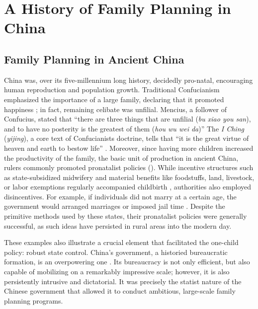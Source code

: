 \documentclass[12pt, a4paper, twoside]{article}
\begin{document}
\section{A History of Family Planning in China}
\subsection{Family Planning in Ancient China}

China was, over its five-millennium long history, decidedly pro-natal, encouraging human reproduction and population growth. Traditional Confucianism emphasized the importance of a large family, declaring that it promoted happiness \autocite[p. 935]{WangEtAl2016AJS}; in fact, remaining celibate was unfilial. Mencius, a follower of Confucius, stated that “there are three things that are unfilial (\emph{bu xiao you san}), and to have no posterity is the greatest of them (\emph{hou wu wei da})” \autocite{MenciusLeggeWikisource} The \emph{I Ching} (\emph{yijing}), a core text of Confucianists doctrine, tells that “it is the great virtue of heaven and earth to bestow life” \autocite{LiShuhua2012IChing}. Moreover, since having more children increased the productivity of the family, the basic unit of production in ancient China, rulers commonly promoted pronatalist policies (\cites[p.\ 15]{EntwisleHenderson2000}[p.\ 933]{WangEtAl2016AJS}{SJSUWatkinsCulturalRevolutionSite}). While incentive structures such as state-subsidized midwifery and material benefits like foodstuffs, land, livestock, or labor exemptions regularly accompanied childbirth \autocite[pp.\ 931--934]{WangEtAl2016AJS}, authorities also employed disincentives. For example, if individuals did not marry at a certain age, the government would arranged marriages or imposed jail time \autocite[p.\ 933]{WangEtAl2016AJS}. Despite the primitive methods used by these states, their pronatalist policies were generally successful, as such ideas have persisted in rural areas into the modern day.

These examples also illustrate a crucial element that facilitated the one-child policy: robust state control. China’s government, a historied bureaucratic formation, is an overpowering one \autocite[pp.\ 168--223]{Hui2005}. Its bureaucracy is not only efficient, but also capable of mobilizing on a remarkably impressive scale; however, it is also persistently intrusive and dictatorial. It was precisely the statist nature of the Chinese government that allowed it to conduct ambitious, large-scale family planning programs.
\end{document}
